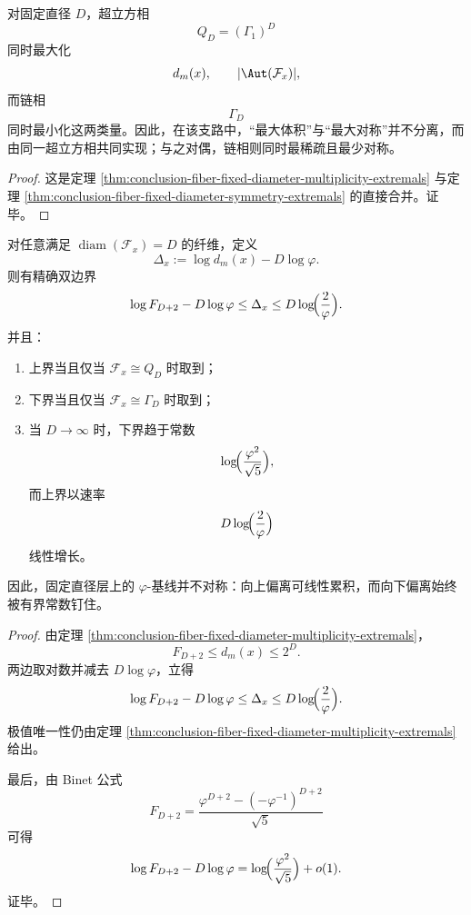 \begin{corollary}[超立方相与链相在固定直径层上形成双重对偶极值]\label{cor:conclusion-fiber-fixed-diameter-cube-chain-dual-extremals}
对固定直径 \(D\)，超立方相
\[
Q_D=(\Gamma_1)^D
\]
同时最大化
\[
d_m(x),\qquad |\Aut(\mathcal F_x)|,
\]
而链相
\[
\Gamma_D
\]
同时最小化这两类量。因此，在该支路中，“最大体积”与“最大对称”并不分离，而由同一超立方相共同实现；与之对偶，链相则同时最稀疏且最少对称。
\end{corollary}
\begin{proof}
这是定理 \ref{thm:conclusion-fiber-fixed-diameter-multiplicity-extremals} 与定理 \ref{thm:conclusion-fiber-fixed-diameter-symmetry-extremals} 的直接合并。证毕。
\end{proof}

\begin{theorem}\label{thm:conclusion-fiber-fixed-diameter-phi-baseline-gap}
对任意满足 \(\operatorname{diam}(\mathcal F_x)=D\) 的纤维，定义
\[
\Delta_x:=\log d_m(x)-D\log\varphi.
\]
则有精确双边界
\[
\log F_{D+2}-D\log\varphi
\le
\Delta_x
\le
D\log\!\Bigl(\frac{2}{\varphi}\Bigr).
\]
并且：
\begin{enumerate}
  \item 上界当且仅当 \(\mathcal F_x\cong Q_D\) 时取到；
  \item 下界当且仅当 \(\mathcal F_x\cong \Gamma_D\) 时取到；
  \item 当 \(D\to\infty\) 时，下界趋于常数
  \[
  \log\!\Bigl(\frac{\varphi^2}{\sqrt5}\Bigr),
  \]
  而上界以速率
  \[
  D\log\!\Bigl(\frac{2}{\varphi}\Bigr)
  \]
  线性增长。
\end{enumerate}
因此，固定直径层上的 \(\varphi\)-基线并不对称：向上偏离可线性累积，而向下偏离始终被有界常数钉住。
\end{theorem}
\begin{proof}
由定理 \ref{thm:conclusion-fiber-fixed-diameter-multiplicity-extremals}，
\[
F_{D+2}\le d_m(x)\le 2^D.
\]
两边取对数并减去 \(D\log\varphi\)，立得
\[
\log F_{D+2}-D\log\varphi
\le
\Delta_x
\le
D\log\!\Bigl(\frac{2}{\varphi}\Bigr).
\]
极值唯一性仍由定理 \ref{thm:conclusion-fiber-fixed-diameter-multiplicity-extremals} 给出。

最后，由 Binet 公式
\[
F_{D+2}=\frac{\varphi^{D+2}-(-\varphi^{-1})^{D+2}}{\sqrt5}
\]
可得
\[
\log F_{D+2}-D\log\varphi
=
\log\!\Bigl(\frac{\varphi^2}{\sqrt5}\Bigr)+o(1).
\]
证毕。
\end{proof}

